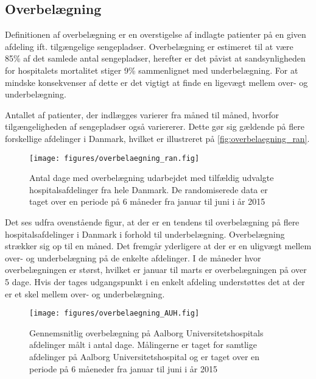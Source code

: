 \subsection{Overbelægning}
Definitionen af overbelægning er en overstigelse af indlagte patienter på en given afdeling ift. tilgængelige sengepladser. Overbelægning er estimeret til at være 85\% af det samlede antal sengepladser, herefter er det påvist at sandsynligheden for hospitalets mortalitet  stiger 9\% sammenlignet med underbelægning. \citep{dodlighed2014} For at mindske konsekvenser af dette er det vigtigt at finde en ligevægt mellem over- og underbelægning.  

Antallet af patienter, der indlægges varierer fra måned til måned, hvorfor tilgængeligheden af sengepladser også variererer. Dette gør sig gældende på flere forskellige afdelinger i Danmark, hvilket er illustreret på \autoref{fig:overbelaegning_ran}.

\begin{figure}[H]
\centering
\texttt{[image: figures/overbelaegning\_ran.fig]}
\caption{Antal dage med overbelægning udarbejdet med tilfældig udvalgte hospitalsafdelinger fra hele Danmark. De randomiserede data er taget over en periode på 6 måneder fra januar til juni i år 2015}
\label{fig:overbelaegning_ran}
\end{figure}

\noindent
Det ses udfra ovenstående figur, at der er en tendens til overbelægning på flere hospitalsafdelinger i Danmark i forhold til underbelægning. Overbelægning strækker sig op til en måned. Det fremgår yderligere at der er en uligvægt mellem over- og underbelægning på de enkelte afdelinger. I de måneder hvor overbelægningen er størst, hvilket er januar til marts er overbelægningen på over 5 dage. Hvis der tages udgangspunkt i en enkelt afdeling understøttes det at der er et skel mellem over- og underbelægning.      

\begin{figure}[H]
\centering
\texttt{[image: figures/overbelaegning\_AUH.fig]}
\caption{Gennemsnitlig overbelægning på Aalborg Universitetshospitals afdelinger målt i antal dage. Målingerne er taget for samtlige afdelinger på Aalborg Universitetshospital og er taget over en periode på 6 måeneder fra januar til juni i år 2015}
\label{fig:overbelaegning_AUH}
\end{figure}

